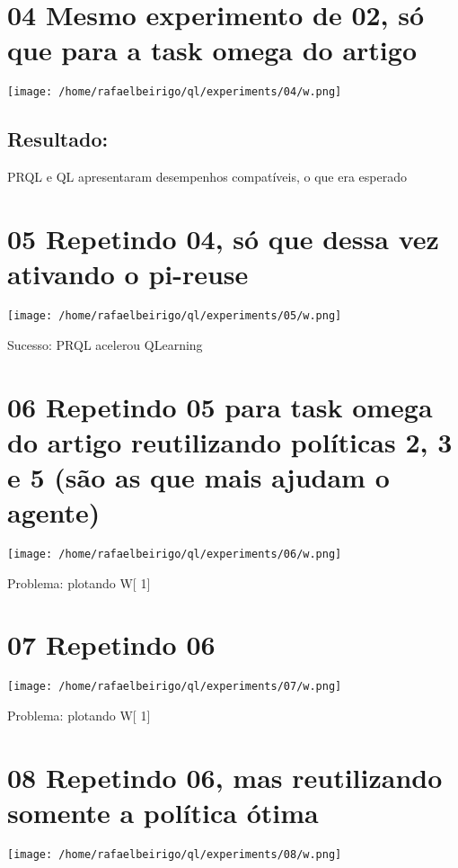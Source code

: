 \documentclass[11pt]{article}
\begin{document}
\section{04 Mesmo experimento de 02, só que para a task omega do artigo}
\label{sec-5}

\centerline{\texttt{[image: /home/rafaelbeirigo/ql/experiments/04/w.png]}}

\subsection{Resultado:}
\label{sec-5.1}

   PRQL e QL apresentaram desempenhos compatíveis, o que era esperado


\section{05 Repetindo 04, só que dessa vez ativando o pi-reuse}
\label{sec-6}

\centerline{\texttt{[image: /home/rafaelbeirigo/ql/experiments/05/w.png]}}

  Sucesso: PRQL acelerou QLearning


\section{06 Repetindo 05 para task omega do artigo reutilizando políticas 2, 3 e 5 (são as que mais ajudam o agente)}
\label{sec-7}

\centerline{\texttt{[image: /home/rafaelbeirigo/ql/experiments/06/w.png]}}

  Problema: plotando W[ 1]


\section{07 Repetindo 06}
\label{sec-8}

\centerline{\texttt{[image: /home/rafaelbeirigo/ql/experiments/07/w.png]}}

  Problema: plotando W[ 1]


\section{08 Repetindo 06, mas reutilizando somente a política ótima}
\label{sec-9}

\centerline{\texttt{[image: /home/rafaelbeirigo/ql/experiments/08/w.png]}}
\end{document}
